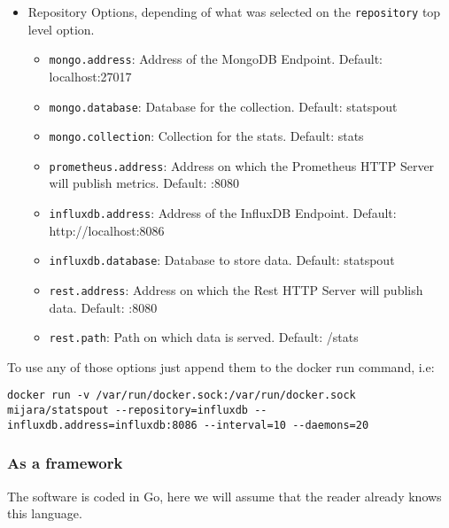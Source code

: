 \begin{itemize}
    \item
        Repository Options, depending of what was selected on the \texttt{repository} top level option.
        
        \begin{itemize}
            \item \texttt{mongo.address}: Address of the MongoDB Endpoint. Default: localhost:27017
            
            \item \texttt{mongo.database}: Database for the collection. Default: statspout
            
            \item \texttt{mongo.collection}: Collection for the stats. Default: stats
            
            \item \texttt{prometheus.address}: Address on which the Prometheus HTTP Server will publish metrics. Default: :8080
            
            \item \texttt{influxdb.address}: Address of the InfluxDB Endpoint. Default: http://localhost:8086
            
            \item \texttt{influxdb.database}: Database to store data. Default: statspout
            
            \item \texttt{rest.address}: Address on which the Rest HTTP Server will publish data. Default: :8080
            
            \item \texttt{rest.path}: Path on which data is served. Default: /stats
        \end{itemize}
\end{itemize}

To use any of those options just append them to the docker run command, i.e:

\begin{lstlisting}
docker run -v /var/run/docker.sock:/var/run/docker.sock mijara/statspout --repository=influxdb --influxdb.address=influxdb:8086 --interval=10 --daemons=20
\end{lstlisting}

\subsubsection{As a framework}

The software is coded in Go, here we will assume that the reader already knows this language.

